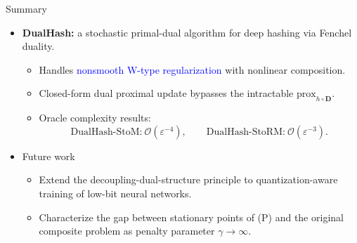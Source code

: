 \documentclass[mathserif,compress,override,9pt]{beamer}
\numberwithin{equation}{section}
\newcommand{\prox}{\mathrm{prox}}
\newcommand{\bD}{\bm{D}}
\newcommand{\calO}{\mathcal{O}}
\newcommand{\blue}[1]{\textcolor{blue}{#1}}
\theoremstyle{remark}
\begin{document}


\begin{frame}{Summary}
\vspace{0.1cm}

\begin{itemize}
\item[\blue{$\bullet$}] \textbf{DualHash:} a stochastic primal-dual algorithm for deep hashing via Fenchel duality.
\begin{itemize}
\item Handles \blue{nonsmooth W-type regularization} with nonlinear composition.
\item Closed-form dual proximal update bypasses the intractable $\prox_{h\circ\bD}$.
\item Oracle complexity results:
\[
\text{DualHash-StoM:}\ \calO(\varepsilon^{-4}),\qquad
\text{DualHash-StoRM:}\ \calO(\varepsilon^{-3}).
\]
\end{itemize}
\item  {Future work}
\begin{itemize}
 \item Extend the decoupling-dual-structure principle to quantization-aware training of low-bit neural networks.
\item Characterize the gap between stationary points of (P) and the original composite problem as penalty parameter $\gamma\to\infty$.
\end{itemize}

\end{itemize}

 

 

 

\end{frame}
\end{document}
